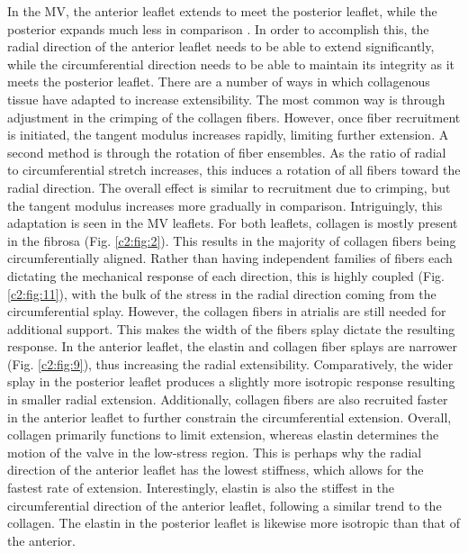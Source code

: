     In the MV, the anterior leaflet extends to meet the posterior leaflet, while the posterior expands much less in comparison \cite{amini_vivo_2012,rausch_vivo_2011}. In order to accomplish this, the radial direction of the anterior leaflet needs to be able to extend significantly, while the circumferential direction needs to be able to maintain its integrity as it meets the posterior leaflet. There are a number of ways in which collagenous tissue have adapted to increase extensibility. The most common way is through adjustment in the crimping of the collagen fibers. However, once fiber recruitment is initiated, the tangent modulus increases rapidly, limiting further extension. A second method is through the rotation of fiber ensembles. As the ratio of radial to circumferential stretch increases, this induces a rotation of all fibers toward the radial direction. The overall effect is similar to recruitment due to crimping, but the tangent modulus increases more gradually in comparison. Intriguingly, this adaptation is seen in the MV leaflets. For both leaflets, collagen is mostly present in the fibrosa (Fig. \ref{c2:fig:2}). This results in the majority of collagen fibers being circumferentially aligned. Rather than having independent families of fibers each dictating the mechanical response of each direction, this is highly coupled (Fig. \ref{c2:fig:11}), with the bulk of the stress in the radial direction coming from the circumferential splay. However, the collagen fibers in atrialis are still needed for additional support. This makes the width of the fibers splay dictate the resulting response. In the anterior leaflet, the elastin and collagen fiber splays are narrower (Fig. \ref{c2:fig:9}), thus increasing the radial extensibility. Comparatively, the wider splay in the posterior leaflet produces a slightly more isotropic response resulting in smaller radial extension. Additionally, collagen fibers are also recruited faster in the anterior leaflet to further constrain the circumferential extension. Overall, collagen primarily functions to limit extension, whereas elastin determines the motion of the valve in the low-stress region. This is perhaps why the radial direction of the anterior leaflet has the lowest stiffness, which allows for the fastest rate of extension. Interestingly, elastin is also the stiffest in the circumferential direction of the anterior leaflet, following a similar trend to the collagen. The elastin in the posterior leaflet is likewise more isotropic than that of the anterior.
    
    
    
